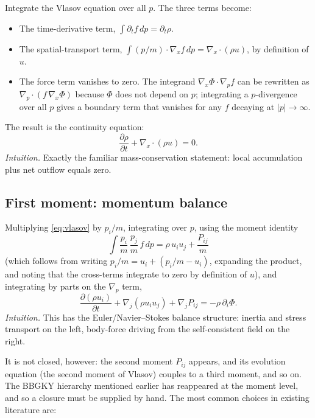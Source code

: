 \documentclass{article}
\begin{document}
Integrate the Vlasov equation over all \(p\). The three terms become:
\begin{itemize}
\item The time-derivative term, \(\int \partial_t f\, dp = \partial_t \rho\).
\item The spatial-transport term, \(\int (p/m) \cdot \nabla_x f\, dp = \nabla_x \cdot (\rho u)\), by definition of \(u\).
\item The force term vanishes to zero. The integrand \(\nabla_x \Phi \cdot \nabla_p f\) can be rewritten as \(\nabla_p \cdot (f\, \nabla_x \Phi)\) because \(\Phi\) does not depend on \(p\); integrating a \(p\)-divergence over all \(p\) gives a boundary term that vanishes for any \(f\) decaying at \(|p| \to \infty\).
\end{itemize}
The result is the continuity equation:
\begin{equation}
\boxed{\;\frac{\partial \rho}{\partial t} + \nabla_x \cdot (\rho u) = 0.\;}
\label{eq:continuity}
\end{equation}
\noindent\emph{Intuition.} Exactly the familiar mass-conservation statement: local accumulation plus net outflow equals zero.

\subsection*{First moment: momentum balance}

Multiplying \eqref{eq:vlasov} by \(p_i/m\), integrating over \(p\), using the moment identity
\begin{equation}
\int \frac{p_i}{m}\,\frac{p_j}{m}\, f\, dp = \rho\, u_i u_j + \frac{P_{ij}}{m}
\label{eq:momidentity}
\end{equation}
(which follows from writing \(p_i/m = u_i + (p_i/m - u_i)\), expanding the product, and noting that the cross-terms integrate to zero by definition of \(u\)), and integrating by parts on the \(\nabla_p\) term,
\begin{equation}
\boxed{\;\frac{\partial (\rho u_i)}{\partial t} + \nabla_j (\rho u_i u_j) + \nabla_j P_{ij} = -\rho\, \partial_i \Phi.\;}
\label{eq:momentum}
\end{equation}
\noindent\emph{Intuition.} This has the Euler/Navier--Stokes balance structure: inertia and stress transport on the left, body-force driving from the self-consistent field on the right.

It is not closed, however: the second moment \(P_{ij}\) appears, and its evolution equation (the second moment of Vlasov) couples to a third moment, and so on. The BBGKY hierarchy mentioned earlier has reappeared at the moment level, and so a closure must be supplied by hand. The most common choices in existing literature are:
\end{document}
